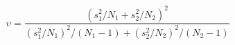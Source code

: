 

\[
\upsilon = \frac{(s^{2}_{1}/N_{1} + s^{2}_{2}/N_{2})^{2}} {(s^{2}_{1}/N_{1})^{2}/(N_{1}-1) + (s^{2}_{2}/N_{2})^{2}/(N_{2}-1) }

\]

